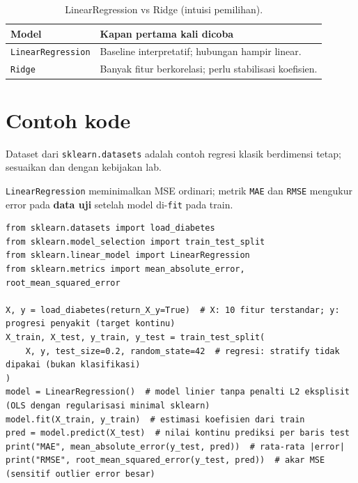 \documentclass[../main.tex]{subfiles}
\begin{document}


\begin{table}[htbp]
\centering
\caption{LinearRegression vs Ridge (intuisi pemilihan).}
\label{tab:linear-ridge}
\begin{tabular}{@{}p{3.6cm}p{9.1cm}@{}}
\toprule
\textbf{Model} & \textbf{Kapan pertama kali dicoba} \\
\midrule
\texttt{LinearRegression} & Baseline interpretatif; hubungan hampir linear. \\
\texttt{Ridge} & Banyak fitur berkorelasi; perlu stabilisasi koefisien. \\
\bottomrule
\end{tabular}
\end{table}

\section{Contoh kode}

Dataset  dari \texttt{sklearn.datasets} adalah contoh regresi klasik berdimensi tetap; sesuaikan  dan  dengan kebijakan lab.

\MulaiPenjelasanKode \texttt{LinearRegression} meminimalkan MSE ordinari; metrik \texttt{MAE} dan \texttt{RMSE} mengukur error pada \textbf{data uji} setelah model di-\texttt{fit} pada train. \SelesaiPenjelasanKode

\begin{lstlisting}[caption=Dataset diabetes dan split]
from sklearn.datasets import load_diabetes
from sklearn.model_selection import train_test_split
from sklearn.linear_model import LinearRegression
from sklearn.metrics import mean_absolute_error, root_mean_squared_error

X, y = load_diabetes(return_X_y=True)  # X: 10 fitur terstandar; y: progresi penyakit (target kontinu)
X_train, X_test, y_train, y_test = train_test_split(
    X, y, test_size=0.2, random_state=42  # regresi: stratify tidak dipakai (bukan klasifikasi)
)
model = LinearRegression()  # model linier tanpa penalti L2 eksplisit (OLS dengan regularisasi minimal sklearn)
model.fit(X_train, y_train)  # estimasi koefisien dari train
pred = model.predict(X_test)  # nilai kontinu prediksi per baris test
print("MAE", mean_absolute_error(y_test, pred))  # rata-rata |error|
print("RMSE", root_mean_squared_error(y_test, pred))  # akar MSE (sensitif outlier error besar)
\end{lstlisting}
\end{document}
